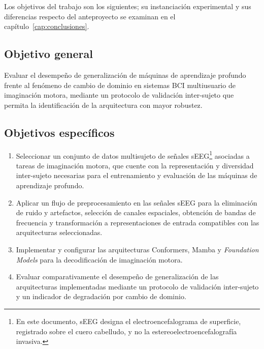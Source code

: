Los objetivos del trabajo son los siguientes; su instanciación experimental y sus diferencias respecto del anteproyecto se examinan en el capítulo~\ref{cap:conclusiones}.


\subsection*{Objetivo general}

Evaluar el desempeño de generalización de máquinas de aprendizaje profundo
frente al fenómeno de cambio de dominio en sistemas BCI multiusuario de
imaginación motora, mediante un protocolo de validación inter-sujeto que
permita la identificación de la arquitectura con mayor robustez.

\subsection*{Objetivos específicos}

\begin{enumerate}
  \item Seleccionar un conjunto de datos multisujeto de señales sEEG\footnote{En este
        documento, sEEG designa el electroencefalograma de superficie, registrado sobre el
        cuero cabelludo, y no la estereoelectroencefalografía invasiva.} asociadas
        a tareas de imaginación motora, que cuente con la representación y
        diversidad inter-sujeto necesarias para el entrenamiento y evaluación
        de las máquinas de aprendizaje profundo.
        \label{oe:1}

  \item Aplicar un flujo de preprocesamiento en las señales sEEG para la
        eliminación de ruido y artefactos, selección de canales espaciales,
        obtención de bandas de frecuencia y transformación a representaciones
        de entrada compatibles con las arquitecturas seleccionadas.
        \label{oe:2}

  \item Implementar y configurar las arquitecturas Conformers, Mamba y
        \textit{Foundation Models} para la decodificación de imaginación
        motora.
        \label{oe:3}

  \item Evaluar comparativamente el desempeño de generalización de las
        arquitecturas implementadas mediante un protocolo de validación
        inter-sujeto y un indicador de degradación por cambio de dominio.
        \label{oe:4}
\end{enumerate}

